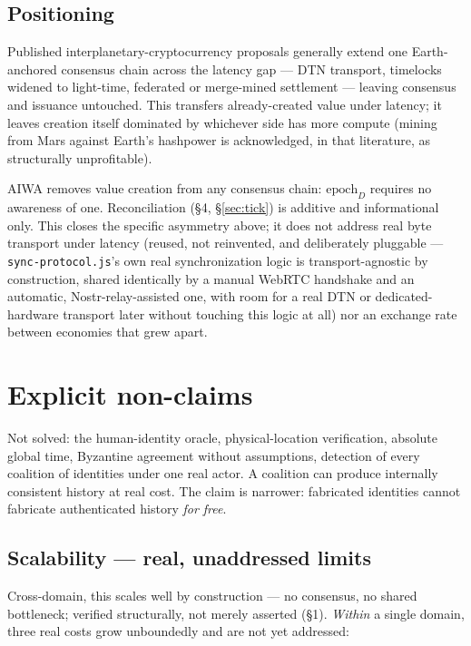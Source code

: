 \documentclass[10pt]{article}
\newcommand{\code}[1]{\texttt{\small #1}}
\begin{document}
\subsection{Positioning}

Published interplanetary-cryptocurrency proposals generally extend one Earth-anchored consensus chain across the latency gap --- DTN transport, timelocks widened to light-time, federated or merge-mined settlement --- leaving consensus and issuance untouched. This transfers already-created value under latency; it leaves creation itself dominated by whichever side has more compute (mining from Mars against Earth's hashpower is acknowledged, in that literature, as structurally unprofitable).

AIWA removes value creation from any consensus chain: $\mathrm{epoch}_D$ requires no awareness of one. Reconciliation (\S4, \S\ref{sec:tick}) is additive and informational only. This closes the specific asymmetry above; it does not address real byte transport under latency (reused, not reinvented, and deliberately pluggable --- \code{sync-protocol.js}'s own real synchronization logic is transport-agnostic by construction, shared identically by a manual WebRTC handshake and an automatic, Nostr-relay-assisted one, with room for a real DTN or dedicated-hardware transport later without touching this logic at all) nor an exchange rate between economies that grew apart.

\section{Explicit non-claims}

Not solved: the human-identity oracle, physical-location verification, absolute global time, Byzantine agreement without assumptions, detection of every coalition of identities under one real actor. A coalition can produce internally consistent history at real cost. The claim is narrower: fabricated identities cannot fabricate authenticated history \emph{for free}.

\subsection{Scalability --- real, unaddressed limits}

Cross-domain, this scales well by construction --- no consensus, no shared bottleneck; verified structurally, not merely asserted (\S1). \emph{Within} a single domain, three real costs grow unboundedly and are not yet addressed:
\end{document}
